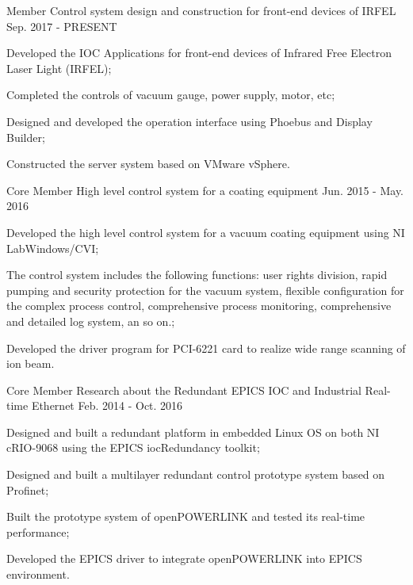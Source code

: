 \begin{cventries}
  \cventry
    {Member} %
    {Control system design and construction for front-end devices of IRFEL} %
    {} %
    {Sep. 2017 - PRESENT} %
    {
      \begin{cvitems} %
        \item {Developed the IOC Applications for front-end devices of Infrared Free Electron Laser Light (IRFEL);}
        \item {Completed the controls of vacuum gauge, power supply, motor, etc;}
        \item {Designed and developed the operation interface using Phoebus and Display Builder;}
        \item {Constructed the server system based on VMware vSphere.}
      \end{cvitems}
    }

  \cventry
    {Core Member} %
    {High level control system for a coating equipment} %
    {} %
    {Jun. 2015 - May. 2016} %
    {
      \begin{cvitems} %
        \item {Developed the high level control system for a vacuum coating equipment using NI LabWindows/CVI;}
        \item {The control system includes the following functions: user rights division, rapid pumping and security protection for the vacuum system, flexible configuration for the complex process control, comprehensive process monitoring, comprehensive and detailed log system, an so on.;}
        \item {Developed the driver program for PCI-6221 card to realize wide range scanning of ion beam.}
      \end{cvitems}
    }

  \cventry
    {Core Member} %
    {Research about the Redundant EPICS IOC and Industrial Real-time Ethernet} %
    {} %
    {Feb. 2014 - Oct. 2016} %
    {
      \begin{cvitems} %
        \item {Designed and built a redundant platform in embedded Linux OS on both NI cRIO-9068 using the EPICS iocRedundancy toolkit;}
        \item {Designed and built a multilayer redundant control prototype system based on Profinet;}
        \item {Built the prototype system of openPOWERLINK and tested its real-time performance;}
        \item {Developed the EPICS driver to integrate openPOWERLINK into EPICS environment.}
      \end{cvitems}
    }

\end{cventries}
